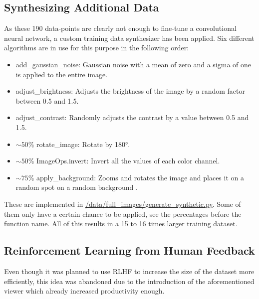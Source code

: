 \documentclass[a4paper,11pt]{report}
\begin{document}
            \subsection{Synthesizing Additional Data}
                As these 190 data-points are clearly not enough to fine-tune a convolutional neural network, a custom training data synthesizer has been applied. Six different algorithms are in use for this purpose in the following order:
                \begin{itemize}
                    \item add\_gaussian\_noise: Gaussian noise \cite{gaussian-noise} with a mean of zero and a sigma of one is applied to the entire image.
                    \item adjust\_brightness: Adjusts the brightness of the image by a random factor between 0.5 and 1.5.
                    \item adjust\_contrast: Randomly adjusts the contrast by a value between 0.5 and 1.5.
                    \item $\sim 50\%$ rotate\_image: Rotate by 180°.
                    \item $\sim 50\%$ ImageOps.invert: Invert all the values of each color channel.
                    \item $\sim 75\%$ apply\_background: Zooms and rotates the image and places it on a random spot on a random background \cite{indoorCVPR_09}.
                \end{itemize}
                These are implemented in \href{https://github.com/lenamerkli/ingredient-scanner/blob/main/data/full_images/generate_synthetic.py}{/data/full\_images/generate\_synthetic.py}. Some of them only have a certain chance to be applied, see the percentages before the function name. All of this results in a 15 to 16 times larger training dataset.
                
            \subsection{Reinforcement Learning from Human Feedback}
                Even though it was planned to use RLHF to increase the size of the dataset more efficiently, this idea was abandoned due to the introduction of the aforementioned viewer which already increased productivity enough.
                
                
\end{document}
